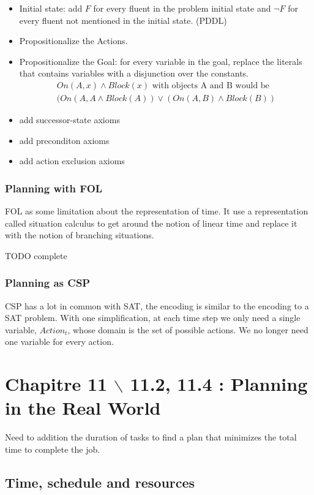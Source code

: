 \begin{itemize}
\item Initial state: add $F$ for every fluent in the problem initial state and $\lnot F$ for every fluent
not mentioned in the initial state. (PDDL)
\item Propositionalize the Actions.
\item Propositionalize the Goal: for every variable in the goal, replace the literals that contains variables with a disjunction over the constants. 
\begin{align}
On(A,x) \land Block(x) \text{ with objects A and B would be} \\
(On(A,A \land Block(A)) \lor (On(A,B) \land Block(B))
\end{align}
\item add successor-state axioms
\item add preconditon axioms
\item add action exclusion axioms
\end{itemize}

\subsubsection{Planning with FOL}
FOL as some limitation about the representation of time. It use a representation called situation calculus to get around the notion of linear time and replace it with the notion of branching situations.

TODO complete


\subsubsection{Planning as CSP}
CSP has a lot in common with SAT, the encoding is similar to the encoding to a SAT problem. 
With one simplification, at each time step we only need a single variable, $Action_t$, whose domain is the set of possible actions. We no longer need one variable for every action.


\section{Chapitre 11 $\backslash$ 11.2, 11.4 : Planning in the Real World}

Need to addition the duration of tasks  to find a plan  that minimizes the
total time to complete the job.

\subsection{Time, schedule and resources}

